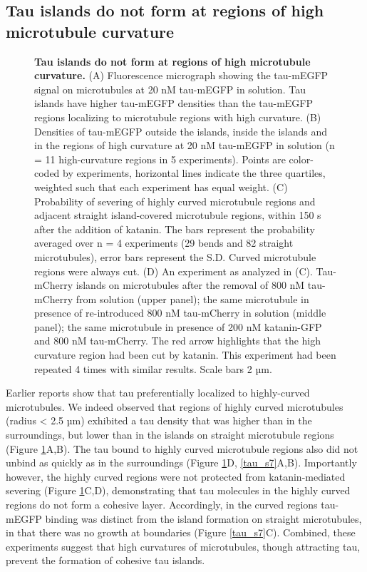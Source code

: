 \subsection{Tau islands do not form at regions of high microtubule curvature}
\begin{figure}[h!tb]
\centering
\caption[Tau islands do not form at regions of high microtubule curvature.]{
\textbf{Tau islands do not form at regions of high microtubule curvature.} (A) Fluorescence micrograph showing the tau-mEGFP signal on microtubules at 20 nM tau-mEGFP in solution. Tau islands have higher tau-mEGFP densities than the tau-mEGFP regions localizing to microtubule regions with high curvature. (B) Densities of tau-mEGFP outside the islands, inside the islands and in the regions of high curvature at 20 nM tau-mEGFP in solution (n = 11 high-curvature regions in 5 experiments). Points are color-coded by experiments, horizontal lines indicate the three quartiles, weighted such that each experiment has equal weight. (C) Probability of severing of highly curved microtubule regions and adjacent straight island-covered microtubule regions, within 150 s after the addition of katanin. The bars represent the probability averaged over n = 4 experiments (29 bends and 82 straight microtubules), error bars represent the S.D. Curved microtubule regions were always cut. (D) An experiment as analyzed in (C). Tau-mCherry islands on microtubules after the removal of 800 nM tau-mCherry from solution (upper panel); the same microtubule in presence of re-introduced 800 nM tau-mCherry in solution (middle panel); the same microtubule in presence of 200 nM katanin-GFP and 800 nM tau-mCherry. The red arrow highlights that the high curvature region  had been cut by katanin. This experiment had been repeated 4 times with similar results. Scale bars 2 µm.
	}\label{tau7}
\end{figure}
Earlier reports show that tau preferentially localized to highly-curved microtubules\parencite{Samsonov2004}. We indeed observed that regions of highly curved microtubules (radius < 2.5 µm) exhibited a tau density that was higher than in the surroundings, but lower than in the islands on straight microtubule regions (Figure \ref{tau7}A,B). The tau bound to highly curved microtubule regions also did not unbind as quickly as in the surroundings (Figure \ref{tau7}D, \ref{tau_s7}A,B). Importantly however, the highly curved regions were not protected from katanin-mediated severing (Figure \ref{tau7}C,D), demonstrating that tau molecules in the highly curved regions do not form a cohesive layer. Accordingly, in the curved regions tau-mEGFP binding was distinct from the island formation on straight microtubules, in that there was no growth at boundaries (Figure \ref{tau_s7}C). Combined, these experiments suggest that high curvatures of microtubules, though attracting tau, prevent the formation of cohesive tau islands.